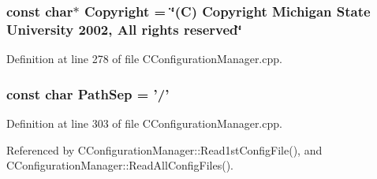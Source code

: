 \subsubsection{\setlength{\rightskip}{0pt plus 5cm}const char$\ast$ Copyright = \char`\"{}(C) Copyright Michigan State University 2002, All rights reserved\char`\"{}\hspace{0.3cm}{\tt  [static]}}\label{CConfigurationManager_8cpp_a0}




Definition at line 278 of file CConfiguration\-Manager.cpp.
\subsubsection{\setlength{\rightskip}{0pt plus 5cm}const char Path\-Sep = '/'\hspace{0.3cm}{\tt  [static]}}\label{CConfigurationManager_8cpp_a1}




Definition at line 303 of file CConfiguration\-Manager.cpp.

Referenced by CConfiguration\-Manager::Read1st\-Config\-File(), and CConfiguration\-Manager::Read\-All\-Config\-Files().